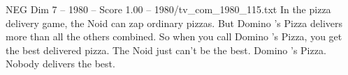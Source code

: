 \begin{textsample}{NEG Dim 7 – 1980 – Score 1.00 – 1980/tv\_com\_1980\_115.txt}  \label{ex:f7_neg_056}
In the pizza delivery game, the Noid can zap ordinary pizzas.
But Domino 's Pizza delivers more than all the others combined.
So when you call Domino 's Pizza, you get the best delivered pizza.
The Noid just can't be the best.
Domino 's Pizza.
Nobody delivers the best.

\end{textsample}
